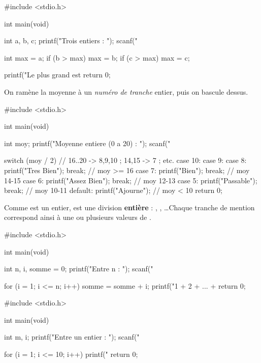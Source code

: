 \begin{codec}
#include <stdio.h>

int main(void) {
    int a, b, c;
    printf("Trois entiers : ");
    scanf("%

    int max = a;
    if (b > max) max = b;
    if (c > max) max = c;

    printf("Le plus grand est %
    return 0;
}
\end{codec}

On ramène la moyenne à un \emph{numéro de tranche} entier, puis on bascule dessus.

\begin{codec}
#include <stdio.h>

int main(void) {
    int moy;
    printf("Moyenne entiere (0 a 20) : ");
    scanf("%

    switch (moy / 2) {        // 16..20 -> 8,9,10 ; 14,15 -> 7 ; etc.
        case 10:
        case 9:
        case 8:  printf("Tres Bien\n");  break;   // moy >= 16
        case 7:  printf("Bien\n");       break;   // moy 14-15
        case 6:  printf("Assez Bien\n"); break;   // moy 12-13
        case 5:  printf("Passable\n");   break;   // moy 10-11
        default: printf("Ajourne\n");             // moy < 10
    }
    return 0;
}
\end{codec}

\begin{remarque}
Comme  est un entier,  est une division \textbf{entière} :
, , \dots Chaque tranche de mention
correspond ainsi à une ou plusieurs valeurs de .
\end{remarque}

\begin{codec}
#include <stdio.h>

int main(void) {
    int n, i, somme = 0;
    printf("Entre n : ");
    scanf("%

    for (i = 1; i <= n; i++) {
        somme = somme + i;
    }
    printf("1 + 2 + ... + %
    return 0;
}
\end{codec}

\begin{codec}
#include <stdio.h>

int main(void) {
    int m, i;
    printf("Entre un entier : ");
    scanf("%

    for (i = 1; i <= 10; i++) {
        printf("%
    }
    return 0;
}
\end{codec}

